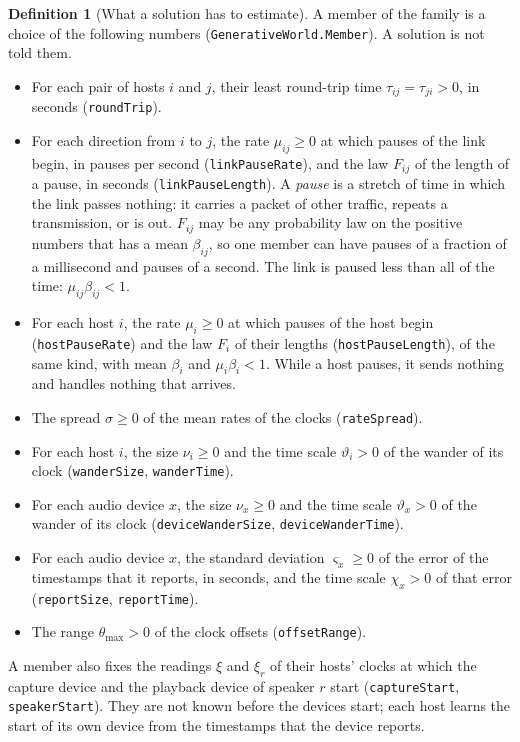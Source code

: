 \documentclass[11pt,a4paper]{article}
\newcommand{\lean}[1]{\texttt{#1}}
\theoremstyle{definition}
\newtheorem{definition}{Definition}[section]
\begin{document}
\begin{definition}[What a solution has to estimate]
A member of the family is a choice of the following numbers
(\lean{GenerativeWorld.\allowbreak Member}). A solution is not told them.
\begin{itemize}
\item For each pair of hosts $i$ and $j$, their least round-trip time
  $\tau_{ij} = \tau_{ji} > 0$, in seconds (\lean{roundTrip}).
\item For each direction from $i$ to $j$, the rate $\mu_{ij} \ge 0$ at
  which pauses of the link begin, in pauses per second
  (\lean{linkPauseRate}), and the law $F_{ij}$ of the length of a pause,
  in seconds (\lean{linkPauseLength}). A \emph{pause} is a stretch of time
  in which the link passes nothing: it carries a packet of other traffic,
  repeats a transmission, or is out. $F_{ij}$ may be any probability law on
  the positive numbers that has a mean $\beta_{ij}$, so one member can have
  pauses of a fraction of a millisecond and pauses of a second. The link is
  paused less than all of the time: $\mu_{ij}\beta_{ij} < 1$.
\item For each host $i$, the rate $\mu_i \ge 0$ at which pauses of the
  host begin (\lean{hostPauseRate}) and the law $F_i$ of their lengths
  (\lean{hostPauseLength}), of the same kind, with mean $\beta_i$ and
  $\mu_i\beta_i < 1$. While a host pauses, it sends nothing and handles
  nothing that arrives.
\item The spread $\sigma \ge 0$ of the mean rates of the clocks
  (\lean{rateSpread}).
\item For each host $i$, the size $\nu_i \ge 0$ and the time scale
  $\vartheta_i > 0$ of the wander of its clock (\lean{wanderSize},
  \lean{wanderTime}).
\item For each audio device $x$, the size $\nu_x \ge 0$ and the time scale
  $\vartheta_x > 0$ of the wander of its clock (\lean{deviceWanderSize},
  \lean{deviceWanderTime}).
\item For each audio device $x$, the standard deviation $\varsigma_x \ge 0$
  of the error of the timestamps that it reports, in seconds, and the time
  scale $\chi_x > 0$ of that error (\lean{reportSize}, \lean{reportTime}).
\item The range $\theta_{\max} > 0$ of the clock offsets
  (\lean{offsetRange}).
\end{itemize}
A member also fixes the readings $\xi$ and $\xi_r$ of their hosts' clocks
at which the capture device and the playback device of speaker $r$ start
(\lean{captureStart}, \lean{speakerStart}). They are not known before the
devices start; each host learns the start of its own device from the
timestamps that the device reports.
\end{definition}
\end{document}
